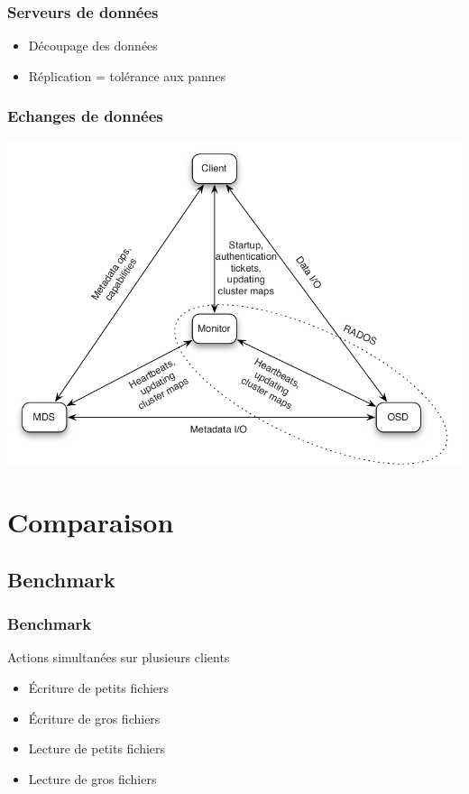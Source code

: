 \documentclass[blue]{beamer}
\begin{document}
        \begin{frame}
                \frametitle{Serveurs de données}
                \begin{itemize}
                        \item Découpage des données
                        \item Réplication = tolérance aux pannes
                \end{itemize}
        \end{frame}

        \begin{frame}
                \frametitle{Echanges de données}
                \begin{center}
	                \includegraphics[width=0.75\linewidth]{../images/Ceph_architecture2.png}
		\end{center}
        \end{frame}

\section{Comparaison}
	\subsection{Benchmark}
		\begin{frame}
		\frametitle{Benchmark}
			Actions simultanées sur plusieurs clients
			\begin{itemize}
				\item Écriture de petits fichiers
				\item Écriture de gros fichiers
				\item Lecture de petits fichiers
				\item Lecture de gros fichiers
			\end{itemize}
		\end{frame}
\end{document}
